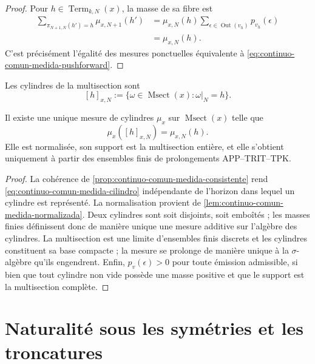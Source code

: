 \begin{proof}
Pour \(h\in\operatorname{Term}_{k,N}(x)\), la masse de sa fibre est
\begin{align*}
 \sum_{\pi_{N+1,N}(h')=h}\mu_{x,N+1}(h')
 &=\mu_{x,N}(h)
   \sum_{\epsilon\in\operatorname{Out}(v_h)}p_{v_h}(\epsilon)\\
 &=\mu_{x,N}(h).
\end{align*}
C'est précisément l'égalité des mesures ponctuelles équivalente à \eqref{eq:continuo-comun-medida-pushforward}.
\end{proof}

Les cylindres de la multisection sont
\begin{equation}
\label{eq:continuo-comun-cilindro-msect}
 [h]_{x,N}
 :=\{\omega\in\operatorname{Msect}(x):
       \omega|_N=h\}.
\end{equation}

\begin{theorem}
\label{thm:continuo-comun-medida-canonica}
Il existe une unique mesure de cylindres \(\mu_x\) sur \(\operatorname{Msect}(x)\) telle que
\begin{equation}
\label{eq:continuo-comun-medida-cilindro}
 \mu_x([h]_{x,N})=\mu_{x,N}(h).
\end{equation}
Elle est normalisée, son support est la multisection entière, et elle s'obtient uniquement à partir des ensembles finis de prolongements APP--TRIT--TPK.
\end{theorem}

\begin{proof}
La cohérence de \cref{prop:continuo-comun-medida-consistente} rend \eqref{eq:continuo-comun-medida-cilindro} indépendante de l'horizon dans lequel un cylindre est représenté. La normalisation provient de \cref{lem:continuo-comun-medida-normalizada}. Deux cylindres sont soit disjoints, soit emboîtés ; les masses finies définissent donc de manière unique une mesure additive sur l'algèbre des cylindres. La multisection est une limite d'ensembles finis discrets et les cylindres constituent sa base compacte ; la mesure se prolonge de manière unique à la \(\sigma\)-algèbre qu'ils engendrent. Enfin, \(p_v(\epsilon)>0\) pour toute émission admissible, si bien que tout cylindre non vide possède une masse positive et que le support est la multisection complète.
\end{proof}

\section{Naturalité sous les symétries et les troncatures}
\label{sec:continuo-comun-naturalidad}

